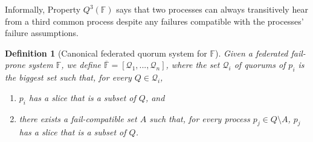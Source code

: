 \documentclass[11pt,letterpaper]{article}
\newtheorem{definition}{Definition}
\begin{document}
Informally, Property $Q^3(\mathbb{F})$ says that two processes can always transitively hear from a third common process despite any failures compatible with the processes' failure assumptions.

\begin{definition}[Canonical federated quorum system for $\mathbb{F}$]
  \label{def:canonical}
  Given a federated fail-prone system $\mathbb{F}$, we define $\overline{\mathbb{F}}=\left[\mathcal{Q}_1,...,\mathcal{Q}_n\right]$, where the set $\mathcal{Q}_i$ of quorums of $p_i$ is the biggest set such that, for every $Q\in\mathcal{Q}_i$,
  \begin{enumerate}
    \item $p_i$ has a slice that is a subset of $Q$, and
    \item there exists a fail-compatible set $A$ such that, for every process $p_j\in Q\setminus A$, $p_j$ has a slice that is a subset of $Q$.
  \end{enumerate}
\end{definition}


\end{document}
